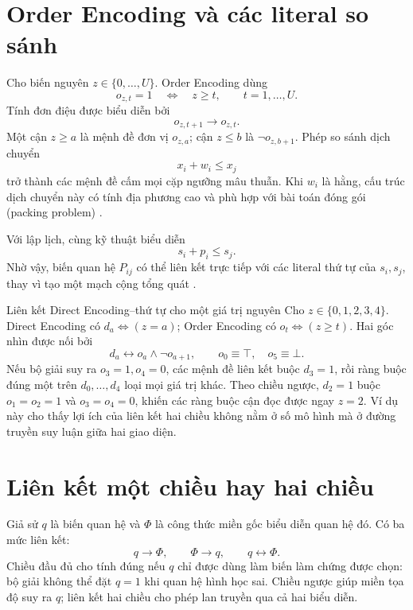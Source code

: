 \section{Order Encoding và các literal so sánh}

Cho biến nguyên \(z\in\{0,\ldots,U\}\). Order Encoding dùng
\[
  o_{z,t}=1
  \quad\Longleftrightarrow\quad
  z\ge t,
  \qquad t=1,\ldots,U.
\]
Tính đơn điệu được biểu diễn bởi
\[
  o_{z,t+1}\rightarrow o_{z,t}.
\]
Một cận \(z\ge a\) là mệnh đề đơn vị \(o_{z,a}\); cận \(z\le b\) là
\(\neg o_{z,b+1}\). Phép so sánh dịch chuyển
\[
  x_i+w_i\le x_j
\]
trở thành các mệnh đề cấm mọi cặp ngưỡng mâu thuẫn. Khi \(w_i\) là hằng, cấu
trúc dịch chuyển này có tính địa phương cao và phù hợp với bài toán đóng gói (packing problem)
\parencite{soh2010binpacking,kieu2025strip,kieu2025bin}.

Với lập lịch, cùng kỹ thuật biểu diễn
\[
  s_i+p_i\le s_j.
\]
Nhờ vậy, biến quan hệ \(P_{ij}\) có thể liên kết trực tiếp với các literal thứ
tự của \(s_i,s_j\), thay vì tạo một mạch cộng tổng quát
\parencite{kieu2025scheduling}.

\begin{workedexample}{Liên kết Direct Encoding--thứ tự cho một giá trị nguyên}
Cho \(z\in\{0,1,2,3,4\}\). Direct Encoding có \(d_a\Leftrightarrow(z=a)\);
Order Encoding có \(o_t\Leftrightarrow(z\ge t)\). Hai góc nhìn được nối bởi
\[
  d_a\leftrightarrow o_a\land\neg o_{a+1},
  \qquad o_0\equiv\top,\quad o_5\equiv\bot.
\]
Nếu bộ giải suy ra \(o_3=1,o_4=0\), các mệnh đề liên kết buộc \(d_3=1\), rồi
ràng buộc đúng một trên \(d_0,\ldots,d_4\) loại mọi giá trị khác. Theo chiều
ngược, \(d_2=1\) buộc \(o_1=o_2=1\) và \(o_3=o_4=0\), khiến các ràng buộc cận
đọc được ngay \(z=2\). Ví dụ này cho thấy lợi ích của liên kết hai chiều không
nằm ở số mô hình mà ở đường truyền suy luận giữa hai giao diện.
\end{workedexample}

\section{Liên kết một chiều hay hai chiều}

Giả sử \(q\) là biến quan hệ và \(\Phi\) là công thức miền gốc biểu diễn quan
hệ đó. Có ba mức liên kết:
\[
  q\rightarrow\Phi,\qquad
  \Phi\rightarrow q,\qquad
  q\leftrightarrow\Phi.
\]
Chiều đầu đủ cho tính đúng nếu \(q\) chỉ được dùng làm biến làm chứng được chọn:
bộ giải không thể đặt \(q=1\) khi quan hệ hình học sai. Chiều ngược giúp miền
tọa độ suy ra \(q\); liên kết hai chiều cho phép lan truyền qua cả hai biểu
diễn.

